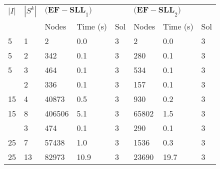 
\begin{tabularx}{\textwidth}{ll *{6}{Y}}
    \toprule
    $|I|$ & $|S^k|$
        & & \\
    \cmidrule(lr){3-5} \cmidrule(lr){6-8}
    & & Nodes & Time (s) & Sol & Nodes & Time (s) & Sol\\
     & 1 & 2 & 0.0 & 3 & 2 & 0.0 & 3\\
    5 & 2 & 342 & 0.1 & 3 & 280 & 0.1 & 3\\
    5 & 3 & 464 & 0.1 & 3 & 534 & 0.1 & 3\\
     & 2 & 336 & 0.1 & 3 & 157 & 0.1 & 3\\
    15 & 4 & 40873 & 0.5 & 3 & 930 & 0.2 & 3\\
    15 & 8 & 406506 & 5.1 & 3 & 65802 & 1.5 & 3\\
     & 3 & 474 & 0.1 & 3 & 290 & 0.1 & 3\\
    25 & 7 & 57438 & 1.0 & 3 & 1536 & 0.3 & 3\\
    25 & 13 & 82973 & 10.9 & 3 & 23690 & 19.7 & 3\\
    \bottomrule
\end{tabularx}
